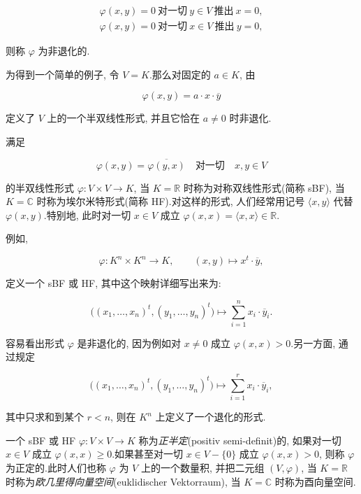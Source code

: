 \[
\begin{array}{l}
\varphi(x, y) = 0 \ \text{对一切} \ y \in V \ \text{推出} \ x = 0, \\
\varphi(x, y) = 0 \ \text{对一切} \ x \in V \ \text{推出} \ y = 0,
\end{array}
\]

则称 $\varphi$ 为非退化的.

为得到一个简单的例子, 令 $V = K$.那么对固定的 $a \in K$, 由

\[
\varphi(x, y) = a \cdot x \cdot \overline{y}
\]

定义了 $V$ 上的一个半双线性形式, 并且它恰在 $a \neq 0$ 时非退化.

\begin{definition}[对称双线性形式与埃尔米特形式]\label{def:7.1.2}
满足

\[
\varphi(x, y) = \overline{\varphi(y, x)} \quad \text{对一切} \quad x, y \in V
\]

的半双线性形式 $\varphi \colon V \times V \longrightarrow K$, 当 $K = \mathbb{R}$ 时称为对称双线性形式(简称 sBF), 当 $K = \mathbb{C}$ 时称为埃尔米特形式(简称 HF).对这样的形式, 人们经常用记号 $\langle x, y \rangle$ 代替 $\varphi(x, y)$.特别地, 此时对一切 $x \in V$ 成立 $\varphi(x, x) = \langle x, x \rangle \in \mathbb{R}$.
\end{definition}

例如,

\[
\varphi \colon K^n \times K^n \longrightarrow K, \qquad (x, y) \longmapsto x^t \cdot \overline{y},
\]

定义一个 sBF 或 HF, 其中这个映射详细写出来为:

\[
\bigl((x_1, \ldots, x_n)^t, (y_1, \ldots, y_n)^t\bigr) \longmapsto \sum_{i = 1}^{n} x_i \cdot \overline{y}_i\text{.}
\]

容易看出形式 $\varphi$ 是非退化的, 因为例如对 $x \neq 0$ 成立 $\varphi(x, x) > 0$.另一方面, 通过规定

\[
\bigl((x_1, \ldots, x_n)^t, (y_1, \ldots, y_n)^t\bigr) \longmapsto \sum_{i = 1}^{r} x_i \cdot \overline{y}_i,
\]

其中只求和到某个 $r < n$, 则在 $K^n$ 上定义了一个退化的形式.

\begin{definition}\label{def:7.1.3}
一个 sBF 或 HF $\varphi \colon V \times V \longrightarrow K$ 称为\emph{正半定}(\textup{positiv semi-definit})的, 如果对一切 $x \in V$ 成立 $\varphi(x, x) \geq 0$.如果甚至对一切 $x \in V - \{0\}$ 成立 $\varphi(x, x) > 0$, 则称 $\varphi$ 为正定的.此时人们也称 $\varphi$ 为 $V$ 上的一个数量积, 并把二元组 $(V, \varphi)$, 当 $K = \mathbb{R}$ 时称为\emph{欧几里得向量空间}(\textup{euklidischer Vektorraum}), 当 $K = \mathbb{C}$ 时称为酉向量空间.
\end{definition}

